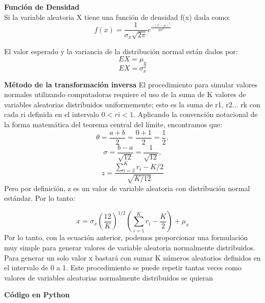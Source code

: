 \documentclass[11pt]{article}
\begin{document}
\noindent\textbf{Función de Densidad}\\
Si la variable aleatoria X tiene una función de densidad f(x) dada como:
\begin{equation}
f(x) = \frac{1}{\sigma_{x}\sqrt{2\pi}} e^{\frac{-(x - \mu)^2}{2\sigma^2}}
\end{equation}

El valor esperado y la variancia de la distribución normal están dados por:
  \begin{equation}
    EX = \mu_{x}
  \end{equation}
  \begin{equation}
    EX = \sigma_{x}^2
  \end{equation}

\noindent\textbf{Método de la transformación inversa\newline}
  El procedimiento para simular valores normales utilizando computadoras requiere el uso de la suma de K valores de
  variables aleatorias distribuidos uniformemente; esto es la suma de r1, r2... rk con cada ri definida en el intervalo $0 <  ri <  1$. Aplicando la convención notacional de la forma matemática del teorema central del límite, encontramos que:
  \begin{equation}
    \theta = \frac{a+b}{2} = \frac{0+1}{2} = \frac{1}{2},
  \end{equation}
  \begin{equation}
    \sigma = \frac{b-a}{\sqrt {12}} = \frac{1}{\sqrt {12}},
  \end{equation}
  \begin{equation}
    z = \frac{\sum_{i=2}^{K}r_{i}-K/2}{\sqrt {K/12}}
  \end{equation}
  Pero por definición, z es un valor de variable aleatoria con distribución normal estándar.
  Por lo tanto:

  \begin{equation}
    x = \sigma_{x}(\frac{12}{K})^{1/2}(\sum_{i=1}^{K}r_{i}-\frac{K}{2}) + \mu_{x}
  \end{equation}
  Por lo tanto, con la ecuación anterior, podemos proporcionar una formulación muy simple para generar valores de
  variable aleatoria normalmente distribuidos. Para generar un solo valor x bastará con sumar K números aleatorios
  definidos en el intervalo de 0 a 1. Este procedimiento se puede repetir tantas veces como valores de variables aleatorias
  normalmente distribuidos se quieran

\noindent\textbf{Código en Python}\\
\end{document}
